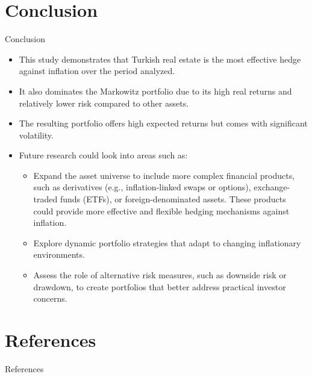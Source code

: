 \documentclass{beamer}
\begin{document}
\section{Conclusion}
\begin{frame}{Conclusion}
\begin{itemize}
\item This study demonstrates that Turkish real estate is the most effective hedge against inflation over the period analyzed.
\item It also dominates the Markowitz portfolio due to its high real returns and relatively lower risk compared to other assets.
\item The resulting portfolio offers high expected returns but comes with significant volatility.
\item Future research could look into areas such as: 
\begin{itemize}
  \item Expand the asset universe to include more complex financial products, such as derivatives (e.g., inflation-linked swaps or options), exchange-traded funds (ETFs), or foreign-denominated assets. These products could provide more effective and flexible hedging mechanisms against inflation.
  \item Explore dynamic portfolio strategies that adapt to changing inflationary environments.
  \item Assess the role of alternative risk measures, such as downside risk or drawdown, to create portfolios that better address practical investor concerns.
\end{itemize}
\end{itemize}
\end{frame}

\section{References}
\begin{frame}[allowframebreaks]{References}
\end{frame}
\end{document}
